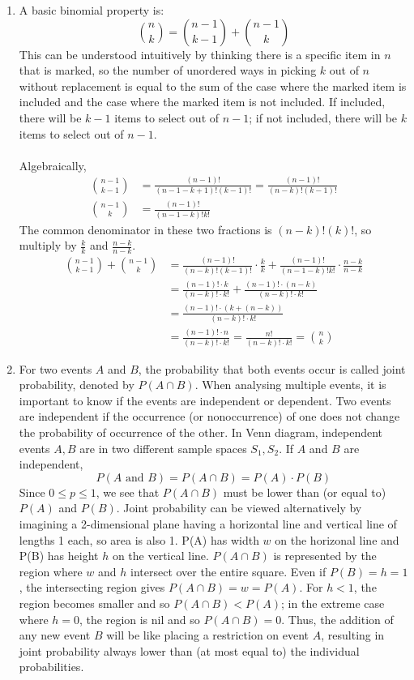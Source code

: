 \documentclass[12pt]{article}
\begin{document}
\begin{enumerate}
\item
A basic binomial property is:
$$
\binom{n}{k} = \binom{n-1}{k-1} + \binom{n-1}{k}
$$
This can be understood intuitively by thinking there is a specific item in $n$ that is marked, so the number of unordered ways in picking $k$ out of $n$ without replacement is equal to
the sum of the case where the marked item is included and the case where the marked item is not included. If included, there will be $k-1$ items to select out of $n-1$; if not included, there will be $k$ items to select out of $n-1$.
\\\\
Algebraically, 
\begin{align*}
\binom{n-1}{k-1} & = \frac{(n-1)!}{(n-1-k+1)!(k-1)!} = \frac{(n-1)!}{(n-k)!(k-1)!} 
\\
\binom{n-1}{k} & = \frac{(n-1)!}{(n-1-k)!k!}
\end{align*}
The common denominator in these two fractions is $(n-k)!(k)!$, so multiply by $\frac{k}{k}$ and $\frac{n-k}{n-k}$.
\begin{align*}
\binom{n-1}{k-1} + \binom{n-1}{k} & = \frac{(n-1)!}{(n-k)!(k-1)!} \cdot \frac{k}{k} + \frac{(n-1)!}{(n-1-k)!k!} \cdot \frac{n-k}{n-k} \\
& = \frac{(n-1)!\cdot k}{(n-k)! \cdot k!} + \frac{(n-1)! \cdot (n-k)}{(n-k)! \cdot k!}  \\
& = \frac{(n-1)! \cdot (k + (n-k))}{(n-k)! \cdot k!} \\
& = \frac{(n-1)! \cdot n}{(n-k)! \cdot k!} = \frac{n!}{(n-k)! \cdot k!} = \binom{n}{k} 
\end{align*}

\item
For two events $A$ and $B$, the probability that both events occur is called joint probability, denoted by $P(A \cap B)$. When analysing multiple events, it is important to know if the events are independent or dependent. 
Two events are independent if the occurrence (or nonoccurrence) of one does not change the probability of occurrence of the other. In Venn diagram, independent events $A, B$ are in two different sample spaces $S_1, S_2$. If $A$ and $B$ are independent, 
$$
P(A \text{ and } B) = P(A \cap B) = P(A) \cdot P(B)
$$
Since $0 \leq p \leq 1$, we see that $P(A \cap B)$ must be lower than (or equal to) $P(A)$ and $P(B)$. Joint probability can be viewed alternatively by 
imagining a 2-dimensional plane having a horizontal line and vertical line of lengths 1 each, so area is also 1. P(A) has width $w$ on the horizonal line and P(B) has height $h$ on the vertical line.  
$P(A \cap B)$ is represented by the region where $w$ and $h$ intersect over the entire square. Even if $P(B) = h = 1$, the intersecting region gives $P(A \cap B) = w = P(A)$. For $h < 1$, the region becomes smaller and so $P(A \cap B) < P(A)$; in the extreme case where $h = 0$, the region is nil and so $P(A \cap B) = 0$.
Thus, the addition of any new event $B$ will be like placing a restriction on event $A$, resulting in joint probability always lower than (at most equal to) the individual probabilities.


\end{enumerate}
\end{document}
